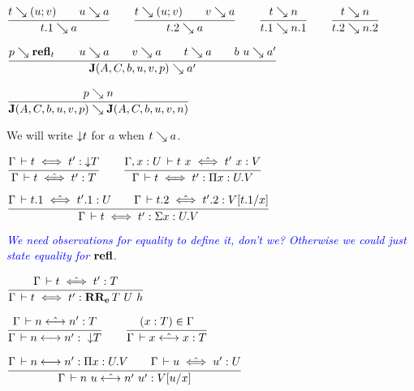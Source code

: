 \documentclass[a4paper,english]{lipics-utf8x}
\newcommand\meta[1]{\noindent\textcolor{blue}{\emph{#1}}}
\begin{document}
  \begin{center}
  \(
    \ru{t \rew (u;v) \qquad
        u \rew a
      }{t.1 \rew a}
    \qquad
    \ru{t \rew (u;v) \qquad
        v \rew a
      }{t.2 \rew a}
    \qquad
    \ru{t \rew n
      }{t.1 \rew n.1}
    \qquad
    \ru{t \rew n
      }{t.2 \rew n.2}
  \)
  \end{center}

  \begin{center}
  \(
    \ru{p \rew \refl_t \qquad
        u \rew a \qquad
        v \rew a \qquad
        t \rew a \qquad
        b\ u \rew a'
      }{\J (A,C,b,u,v,p) \rew a'}
  \)
  \end{center}

  \begin{center}
  \(
    \ru{p \rew n
      }{\J (A,C,b,u,v,p) \rew \J (A,C,b,u,v,n)}
  \)
  \end{center}
  We will write ${\downarrow} t$ for $a$ when $t \searrow a$.


  \begin{center}
  \(
    \ru{\Gamma \der t \iff t' : \red T
      }{\Gamma \der t \hiff t' : T}
    \qquad
    \ru{\Gamma, x:U \der t~x \hiff t'~x : V
      }{\Gamma \der t \iff t' : \Pi x:U.V}
  \)
  \end{center}

  \begin{center}
  \(
    \ru{\Gamma \der t.1 \hiff t'.1 : U \qquad
        \Gamma \der t.2 \hiff t'.2 : V[t.1/x]
      }{\Gamma \der t \iff t' : \Sigma x:U.V}
  \)
  \end{center}

  \meta{We need observations for equality to define it, don't we?
  Otherwise we could just state equality for $\operatorname{\mathbf{refl}}$.}

  \begin{center}
  \(
    \ru{\Gamma \der t \hiff t' : T
      }{\Gamma \der t \iff t' : \RRe{T}{U}{h}}
  \)
  \end{center}


  \begin{center}
  \(
    \ru{\Gamma \der n \hsteq n' : T
      }{\Gamma \der n \steq n' :\ \red T}
    \qquad
    \ru{(x:T) \in \Gamma
      }{\Gamma \der x \hsteq x : T}
  \)
  \end{center}

  \begin{center}
  \(
    \ru{\Gamma \der n \steq n' : \Pi x:U.V \qquad
        \Gamma \der u \hiff u' : U
      }{\Gamma \der n~u \hsteq n'~u' : V[u/x]}
  \)
  \end{center}
\end{document}
